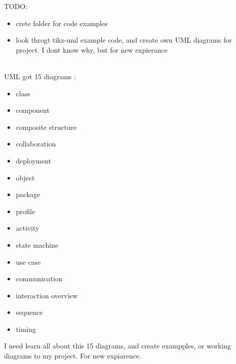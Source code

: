 \documentclass{article}
\begin{document}
TODO:
\begin{itemize}
  \item crete folder for code examples
  \item look throgt tikz-uml example code, and create own UML diagrams for project. I dont know why, but for new expierance
\end{itemize}\\
UML got 15 diagrams :\\
\begin{itemize}
  \item class
  \item component
  \item composite structure
  \item collaboration
  \item deployment
  \item object
  \item package 
  \item profile
  \item activity
  \item state machine
  \item use case
  \item communication
  \item interaction overview
  \item sequence
  \item timing
\end{itemize}
I need learn all about this 15 diagrams, and create exampples, or working diagrams to my project. For new expiarence.
\end{document}

